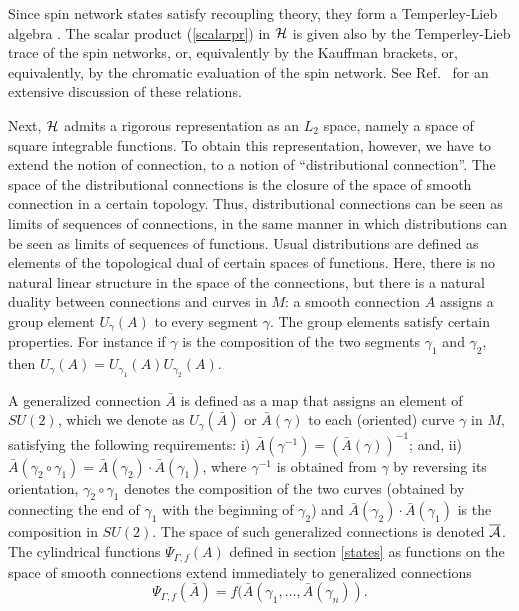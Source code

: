 Since spin network states satisfy recoupling theory, they form a 
Temperley-Lieb algebra \cite{Kauffman94}.  The scalar product 
(\ref{scalarpr}) in $\cal H$ is given also by the Temperley-Lieb 
trace of the spin networks, or, equivalently by the Kauffman 
brackets, or, equivalently, by the chromatic evaluation of the 
spin network.  See Ref.~\cite{DePietriRovelli} for an extensive 
discussion of these relations. 

Next, $\cal H$ admits a rigorous representation as an $L_{2}$ 
space, namely a space of square integrable functions.  To obtain 
this representation, however, we have to extend the notion of 
connection, to a notion of ``distributional connection''.  The 
space of the distributional connections is the closure of the 
space of smooth connection in a certain topology.  Thus, 
distributional connections can be seen as limits of sequences of 
connections, in the same manner in which distributions can be 
seen as limits of sequences of functions.  Usual distributions 
are defined as elements of the topological dual of certain spaces 
of functions.  Here, there is no natural linear structure in the 
space of the connections, but there is a natural duality between 
connections and curves in $M$: a smooth connection $A$ assigns a 
group element $U_{\gamma}(A)$ to every segment $\gamma$.  The 
group elements satisfy certain properties.  For instance if  
$\gamma$ is the composition of the two segments $\gamma_{1}$ and 
$\gamma_{2}$, then $U_{\gamma}(A) = U_{\gamma_{1}}(A) 
U_{\gamma_{2}}(A)$. 

A generalized connection $\bar{A}$ is defined as a map that 
assigns an element of $SU(2)$, which we denote as 
$U_{\gamma}(\bar{A})$ or $\bar{A}(\gamma)$ to each (oriented) 
curve $\gamma$ in $M$, satisfying the following requirements: i) 
$\bar{A}(\gamma^{-1}) = (\bar{A}(\gamma))^{-1}$; and, ii) 
$\bar{A}(\gamma_2\circ \gamma_1) = \bar{A}(\gamma_2)\cdot 
\bar{A}(\gamma_1)$, where $\gamma^{-1}$ is obtained from $\gamma$ 
by reversing its orientation, $\gamma_2\circ \gamma_1$ denotes 
the composition of the two curves (obtained by connecting the end 
of $\gamma_1$ with the beginning of $\gamma_2$) and 
$\bar{A}(\gamma_2)\cdot\bar{A}(\gamma_1)$ is the composition in 
$SU(2)$.  The space of such generalized connections is denoted 
$\overline{\cal A}$. The cylindrical functions $\Psi_{\Gamma, f}(A)$ 
defined in section \ref{states} as functions on the space of smooth 
connections extend immediately to generalized connections
\begin{equation}
	\Psi_{\Gamma,f}(\bar A)=f(\bar A(\gamma_{1},\ldots,\bar 
	A(\gamma_{n})).
\end{equation}

